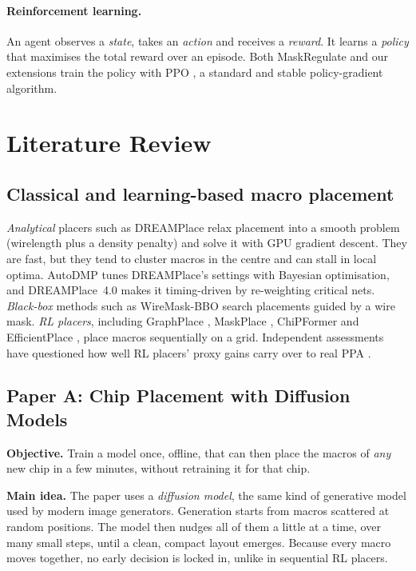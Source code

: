 \documentclass{article}
\begin{document}
\paragraph{Reinforcement learning.} An agent observes a \emph{state}, takes an \emph{action} and
receives a \emph{reward}. It learns a \emph{policy} that maximises the total reward over an episode.
Both MaskRegulate and our extensions train the policy with PPO \citep{schulman2017ppo}, a standard
and stable policy-gradient algorithm.

\section{Literature Review}
\label{sec:lit}

\subsection{Classical and learning-based macro placement}
\emph{Analytical} placers such as DREAMPlace \citep{lin2021dreamplace} relax placement into a smooth
problem (wirelength plus a density penalty) and solve it with GPU gradient descent. They are fast, but
they tend to cluster macros in the centre and can stall in local optima. AutoDMP
\citep{agnesina2023autodmp} tunes DREAMPlace's settings with Bayesian optimisation, and DREAMPlace~4.0
\citep{liao2023dreamplace4} makes it timing-driven by re-weighting critical nets. \emph{Black-box}
methods such as WireMask-BBO \citep{shi2023wiremask} search placements guided by a wire mask.
\emph{RL placers}, including GraphPlace \citep{mirhoseini2021graph}, MaskPlace \citep{lai2022maskplace},
ChiPFormer \citep{lai2023chipformer} and EfficientPlace \citep{geng2024efficientplace}, place macros
sequentially on a grid. Independent assessments have questioned how well RL placers' proxy gains carry
over to real PPA \citep{cheng2023assessment}.

\subsection{Paper A: Chip Placement with Diffusion Models \citep{lee2025diffusion}}
\textbf{Objective.} Train a model once, offline, that can then place the macros of \emph{any} new chip
in a few minutes, without retraining it for that chip.

\textbf{Main idea.} The paper uses a \emph{diffusion model}, the same kind of generative model used by
modern image generators. Generation starts from macros scattered at random positions. The model then
nudges all of them a little at a time, over many small steps, until a clean, compact layout emerges.
Because every macro moves together, no early decision is locked in, unlike in sequential RL placers.
\end{document}
